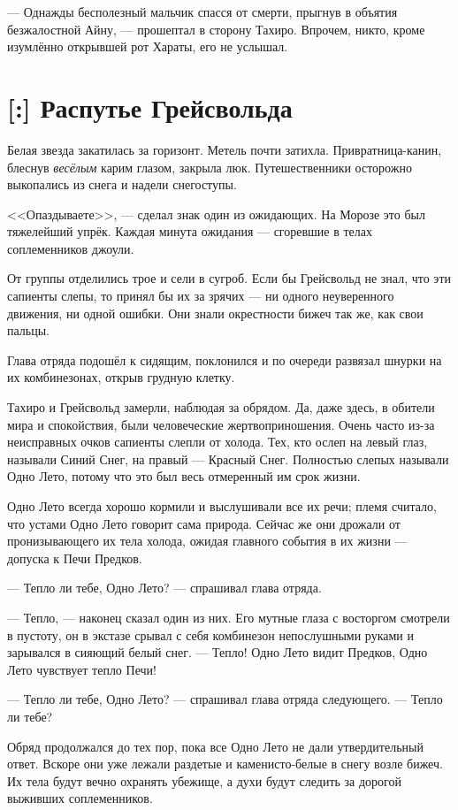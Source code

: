 --- Однажды бесполезный мальчик спасся от смерти, прыгнув в объятия безжалостной Айну, --- прошептал в сторону Тахиро.
Впрочем, никто, кроме изумлённо открывшей рот Хараты, его не услышал.

\section{[:] Распутье Грейсвольда}

Белая звезда закатилась за горизонт.
Метель почти затихла.
Привратница-канин, блеснув \emph{весёлым} карим глазом, закрыла люк.
Путешественники осторожно выкопались из снега и надели снегоступы.

<<Опаздываете>>, --- сделал знак один из ожидающих.
На Морозе это был тяжелейший упрёк.
Каждая минута ожидания --- сгоревшие в телах соплеменников джоули.

От группы отделились трое и сели в сугроб.
Если бы Грейсвольд не знал, что эти сапиенты слепы, то принял бы их за зрячих --- ни одного неуверенного движения, ни одной ошибки.
Они знали окрестности бижеч так же, как свои пальцы.

Глава отряда подошёл к сидящим, поклонился и по очереди развязал шнурки на их комбинезонах, открыв грудную клетку.

Тахиро и Грейсвольд замерли, наблюдая за обрядом.
Да, даже здесь, в обители мира и спокойствия, были человеческие жертвоприношения.
Очень часто из-за неисправных очков сапиенты слепли от холода.
Тех, кто ослеп на левый глаз, называли Синий Снег, на правый --- Красный Снег.
Полностью слепых называли Одно Лето, потому что это был весь отмеренный им срок жизни.

Одно Лето всегда хорошо кормили и выслушивали все их речи;
племя считало, что устами Одно Лето говорит сама природа.
Сейчас же они дрожали от пронизывающего их тела холода, ожидая главного события в их жизни --- допуска к Печи Предков.

--- Тепло ли тебе, Одно Лето? --- спрашивал глава отряда.

--- Тепло, --- наконец сказал один из них.
Его мутные глаза с восторгом смотрели в пустоту, он в экстазе срывал с себя комбинезон непослушными руками и зарывался в сияющий белый снег.
--- Тепло!
Одно Лето видит Предков, Одно Лето чувствует тепло Печи!

--- Тепло ли тебе, Одно Лето? --- спрашивал глава отряда следующего.
--- Тепло ли тебе?

Обряд продолжался до тех пор, пока все Одно Лето не дали утвердительный ответ.
Вскоре они уже лежали раздетые и каменисто-белые в снегу возле бижеч.
Их тела будут вечно охранять убежище, а духи будут следить за дорогой выживших соплеменников.

